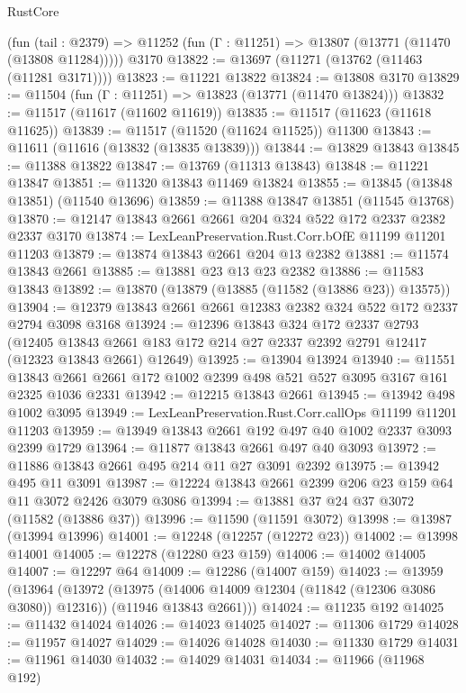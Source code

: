 \begin{lexlean}{RustCore}
\begin{coremodule}
    (fun (tail : @2379) => @11252 (fun (Γ : @11251) => @13807 (@13771 (@11470 (@13808 @11284)))))
    @3170
@13822 := @13697 (@11271 (@13762 (@11463 (@11281 @3171))))
@13823 := @11221 @13822
@13824 := @13808 @3170
@13829 := @11504 (fun (Γ : @11251) => @13823 (@13771 (@11470 @13824)))
@13832 := @11517 (@11617 (@11602 @11619))
@13835 := @11517 (@11623 (@11618 @11625))
@13839 := @11517 (@11520 (@11624 @11525)) @11300
@13843 := @11611 (@11616 (@13832 (@13835 @13839)))
@13844 := @13829 @13843
@13845 := @11388 @13822
@13847 := @13769 (@11313 @13843)
@13848 := @11221 @13847
@13851 := @11320 @13843 @11469 @13824
@13855 := @13845 (@13848 @13851) (@11540 @13696)
@13859 := @11388 @13847 @13851 (@11545 @13768)
@13870 := @12147 @13843 @2661 @2661 @204 @324 @522 @172 @2337 @2382 @2337 @3170
@13874 := LexLeanPreservation.Rust.Corr.bOfE @11199 @11201 @11203
@13879 := @13874 @13843 @2661 @204 @13 @2382
@13881 := @11574 @13843 @2661
@13885 := @13881 @23 @13 @23 @2382
@13886 := @11583 @13843
@13892 := @13870 (@13879 (@13885 (@11582 (@13886 @23)) @13575))
@13904 := @12379 @13843 @2661 @2661 @12383 @2382 @324 @522 @172 @2337 @2794 @3098 @3168
@13924 := @12396
    @13843
    @324
    @172
    @2337
    @2793
    (@12405 @13843 @2661 @183 @172 @214 @27 @2337 @2392 @2791 @12417 (@12323 @13843 @2661) @12649)
@13925 := @13904 @13924
@13940 := @11551
    @13843
    @2661
    @2661
    @172
    @1002
    @2399
    @498
    @521
    @527
    @3095
    @3167
    @161
    @2325
    @1036
    @2331
@13942 := @12215 @13843 @2661
@13945 := @13942 @498 @1002 @3095
@13949 := LexLeanPreservation.Rust.Corr.callOps @11199 @11201 @11203
@13959 := @13949 @13843 @2661 @192 @497 @40 @1002 @2337 @3093 @2399 @1729
@13964 := @11877 @13843 @2661 @497 @40 @3093
@13972 := @11886 @13843 @2661 @495 @214 @11 @27 @3091 @2392
@13975 := @13942 @495 @11 @3091
@13987 := @12224 @13843 @2661 @2399 @206 @23 @159 @64 @11 @3072 @2426 @3079 @3086
@13994 := @13881 @37 @24 @37 @3072 (@11582 (@13886 @37))
@13996 := @11590 (@11591 @3072)
@13998 := @13987 (@13994 @13996)
@14001 := @12248 (@12257 (@12272 @23))
@14002 := @13998 @14001
@14005 := @12278 (@12280 @23 @159)
@14006 := @14002 @14005
@14007 := @12297 @64
@14009 := @12286 (@14007 @159)
@14023 := @13959
    (@13964
      (@13972
        (@13975 (@14006 @14009 @12304 (@11842 (@12306 @3086 @3080)) @12316))
        (@11946 @13843 @2661)))
@14024 := @11235 @192
@14025 := @11432 @14024
@14026 := @14023 @14025
@14027 := @11306 @1729
@14028 := @11957 @14027
@14029 := @14026 @14028
@14030 := @11330 @1729
@14031 := @11961 @14030
@14032 := @14029 @14031
@14034 := @11966 (@11968 @192)

\end{coremodule}
\end{lexlean}
